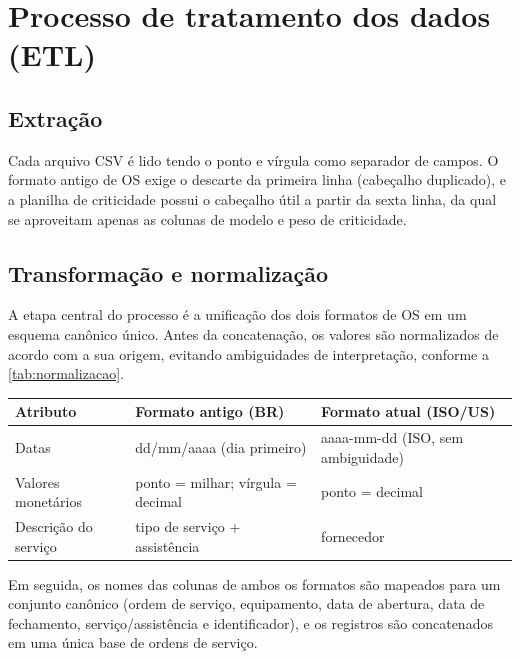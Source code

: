 \section{Processo de tratamento dos dados (ETL)}

\subsection*{Extração}

Cada arquivo CSV é lido tendo o ponto e vírgula como separador de campos. O
formato antigo de OS exige o descarte da primeira linha (cabeçalho duplicado), e
a planilha de criticidade possui o cabeçalho útil a partir da sexta linha, da
qual se aproveitam apenas as colunas de modelo e peso de criticidade.

\subsection*{Transformação e normalização}

A etapa central do processo é a unificação dos dois formatos de OS em um esquema
canônico único. Antes da concatenação, os valores são normalizados de acordo com
a sua origem, evitando ambiguidades de interpretação, conforme a
\ref{tab:normalizacao}.

\begin{table}[H]
    \centering
    \begin{tabular}{p{2.8cm}p{5cm}p{5cm}}
        \hline
        \textbf{Atributo} & \textbf{Formato antigo (BR)} & \textbf{Formato atual (ISO/US)} \\
        \hline
        Datas & dd/mm/aaaa (dia primeiro) & aaaa-mm-dd (ISO, sem ambiguidade) \\
        Valores monetários & ponto = milhar; vírgula = decimal & ponto = decimal \\
        Descrição do serviço & tipo de serviço + assistência & fornecedor \\
        \hline
    \end{tabular}
\end{table}

Em seguida, os nomes das colunas de ambos os formatos são mapeados para um
conjunto canônico (ordem de serviço, equipamento, data de abertura, data de
fechamento, serviço/assistência e identificador), e os registros são concatenados
em uma única base de ordens de serviço.

